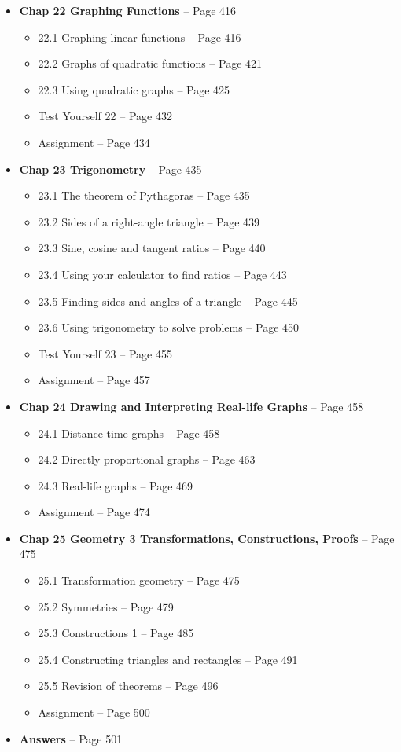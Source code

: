 \documentclass{article}
\begin{document}
\begin{itemize}
    \item \textbf{Chap 22 Graphing Functions} -- Page 416
    \begin{itemize}
        \item 22.1 Graphing linear functions -- Page 416
        \item 22.2 Graphs of quadratic functions -- Page 421
        \item 22.3 Using quadratic graphs -- Page 425
        \item Test Yourself 22 -- Page 432
        \item Assignment -- Page 434
    \end{itemize}

    \item \textbf{Chap 23 Trigonometry} -- Page 435
    \begin{itemize}
        \item 23.1 The theorem of Pythagoras -- Page 435
        \item 23.2 Sides of a right-angle triangle -- Page 439
        \item 23.3 Sine, cosine and tangent ratios -- Page 440
        \item 23.4 Using your calculator to find ratios -- Page 443
        \item 23.5 Finding sides and angles of a triangle -- Page 445
        \item 23.6 Using trigonometry to solve problems -- Page 450
        \item Test Yourself 23 -- Page 455
        \item Assignment -- Page 457
    \end{itemize}

    \item \textbf{Chap 24 Drawing and Interpreting Real-life Graphs} -- Page 458
    \begin{itemize}
        \item 24.1 Distance-time graphs -- Page 458
        \item 24.2 Directly proportional graphs -- Page 463
        \item 24.3 Real-life graphs -- Page 469
        \item Assignment -- Page 474
    \end{itemize}

    \item \textbf{Chap 25 Geometry 3 Transformations, Constructions, Proofs} -- Page 475
    \begin{itemize}
        \item 25.1 Transformation geometry -- Page 475
        \item 25.2 Symmetries -- Page 479
        \item 25.3 Constructions 1 -- Page 485
        \item 25.4 Constructing triangles and rectangles -- Page 491
        \item 25.5 Revision of theorems -- Page 496
        \item Assignment -- Page 500
    \end{itemize}

    \item \textbf{Answers} -- Page 501
\end{itemize}
\end{document}
